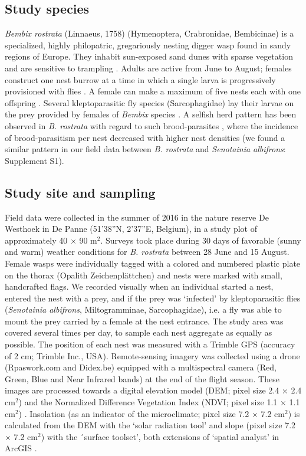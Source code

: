\documentclass[10pt, twoside]{book} %
\begin{document}
	\subsection{Study species}
	\textit{Bembix rostrata} (Linnaeus, 1758) (Hymenoptera, Crabronidae, Bembicinae) is a specialized, highly philopatric, gregariously nesting digger wasp found in sandy regions of Europe. They inhabit sun-exposed sand dunes with sparse vegetation \citep{larsson1986} and are sensitive to trampling \citep{bonte2005}. Adults are active from June to August; females construct one nest burrow at a time in which a single larva is progressively provisioned with flies \citep{nielsen1945, field2005}. A female can make a maximum of five nests each with one offspring \citep{larsson1989}. Several kleptoparasitic fly species (Sarcophagidae) lay their larvae \citep[ovi-larviposition;][]{piwczynski2017} on the prey provided by females of \textit{Bembix} species \citep{nielsen1945, evans2007}. A selfish herd pattern has been observed in \textit{B. rostrata} with regard to such brood-parasites \citep{larsson1986}, where the incidence of brood-parasitism per nest decreased with higher nest densities (we found a similar pattern in our field data between \textit{B. rostrata} and \textit{Senotainia albifrons}: Supplement S1).\\
	
	\subsection{Study site and sampling}
	Field data were collected in the summer of 2016 in the nature reserve De Westhoek in De Panne (51'38''N, 2'37''E, Belgium), in a study plot of approximately 40 $\times$ 90 m$^2$. Surveys took place during 30 days of favorable (sunny and warm) weather conditions for \textit{B. rostrata} \citep{schone1991} between 28 June and 15 August. Female wasps were individually tagged with a colored and numbered plastic plate on the thorax (Opalith Zeichenpl\"{a}ttchen) and nests were marked with small, handcrafted flags. We recorded visually when an individual started a nest, entered the nest with a prey, and if the prey was `infected' by kleptoparasitic flies (\textit{Senotainia albifrons}, Miltogramminae, Sarcophagidae), i.e. a fly was able to mount the prey carried by a female at the nest entrance. The study area was covered several times per day, to sample each nest aggregate as equally as possible. The position of each nest was measured with a Trimble GPS (accuracy of 2 cm; Trimble Inc., USA). Remote-sensing imagery was collected using a drone (Rpaswork.com and Didex.be) equipped with a multispectral camera (Red, Green, Blue and Near Infrared bands) at the end of the flight season. These images are processed towards a digital elevation model (DEM; pixel size 2.4 $\times$ 2.4 cm$^2$) and the Normalized Difference Vegetation Index (NDVI; pixel size 1.1 $\times$ 1.1 cm$^2$) \citep{pettorelli2013}. Insolation (as an indicator of the microclimate; pixel size 7.2 $\times$ 7.2 cm$^2$) is calculated from the DEM with the `solar radiation tool' and slope (pixel size 7.2 $\times$ 7.2 cm$^2$) with the ´surface toolset', both extensions of `spatial analyst' in ArcGIS \citep{esri2011}.\\
	
\end{document}
